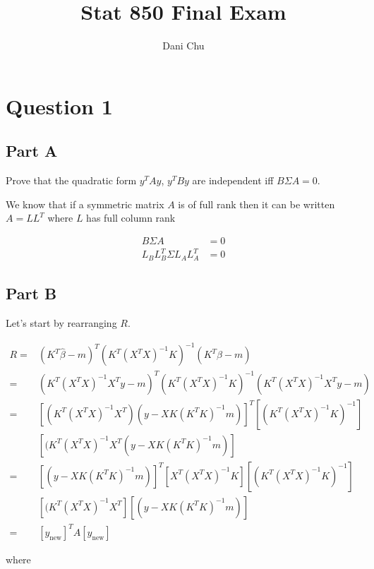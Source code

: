 \documentclass[]{book}
\title{Stat 850 Final Exam}
\author{Dani Chu}
\date{}
\begin{document}
\maketitle

{
\setcounter{tocdepth}{1}
\tableofcontents
}
\hypertarget{question-1}{%
\chapter{Question 1}\label{question-1}}

\hypertarget{part-a}{%
\section{Part A}\label{part-a}}

Prove that the quadratic form \(y^{T} A y\), \(y^{T} B y\) are independent iff \(B \Sigma A = 0\).

We know that if a symmetric matrix \(A\) is of full rank then it can be written \(A = LL^T\) where \(L\) has full column rank

\begin{align}
  B \Sigma A &= 0 \\
  L_{B}L_{B}^T \Sigma L_{A}L_{A}^T & = 0
\end{align}

\hypertarget{part-b}{%
\section{Part B}\label{part-b}}

Let's start by rearranging \(R\).

\begin{align}
  R =& (K^T \hat{\beta} -m )^T (K^T (X^T X)^{-1} K)^{-1} (K^T \hat{\beta} - m) \\
    =& (K^T (X^T X)^{-1} X^T y - m )^T (K^T (X^T X)^{-1} K)^{-1} (K^T (X^T X)^{-1} X^T y - m) \\
    =& [ (K^T (X^T X)^{-1} X^T ) ( y - X K (K^T K)^{-1} m ) ]^T [ (K^T (X^T X)^{-1} K)^{-1} ] \\
    & [ (K^T (X^T X)^{-1} X^T ( y - X K (K^T K)^{-1} m ) ] \\
    =& [ ( y - X K (K^T K)^{-1} m ) ]^T [ X^T (X^T X)^{-1} K ] [ (K^T (X^T X)^{-1} K)^{-1} ] \\
    & [ (K^T (X^T X)^{-1} X^T] [( y - X K (K^T K)^{-1} m ) ] \\
    =& [y_{\text{new}}]^T A [y_{\text{new}}]
\end{align}

where
\end{document}

